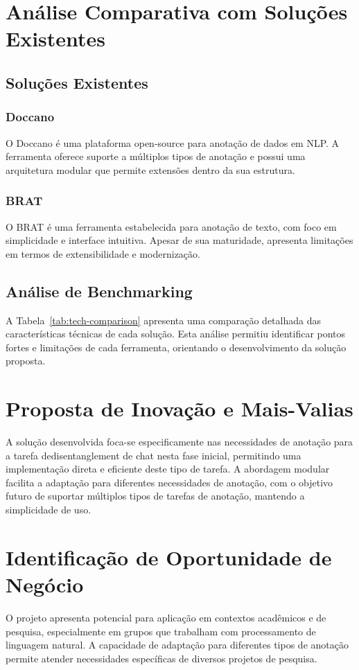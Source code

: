 \section{Análise Comparativa com Soluções Existentes}

\subsection{Soluções Existentes}

\subsubsection{Doccano}
O Doccano é uma plataforma open-source para anotação de dados em NLP. A ferramenta oferece suporte a múltiplos tipos de anotação e possui uma arquitetura modular que permite extensões dentro da sua estrutura.

\subsubsection{BRAT}
O BRAT é uma ferramenta estabelecida para anotação de texto, com foco em simplicidade e interface intuitiva. Apesar de sua maturidade, apresenta limitações em termos de extensibilidade e modernização.

\subsection{Análise de Benchmarking}

A Tabela~\ref{tab:tech-comparison} apresenta uma comparação detalhada das características técnicas de cada solução. Esta análise permitiu identificar pontos fortes e limitações de cada ferramenta, orientando o desenvolvimento da solução proposta.

\section{Proposta de Inovação e Mais-Valias}
A solução desenvolvida foca-se especificamente nas necessidades de anotação para a tarefa dedisentanglement de chat nesta fase inicial, permitindo uma implementação direta e eficiente deste tipo de tarefa. A abordagem modular facilita a adaptação para diferentes necessidades de anotação, com o objetivo futuro de suportar múltiplos tipos de tarefas de anotação, mantendo a simplicidade de uso.

\section{Identificação de Oportunidade de Negócio}
O projeto apresenta potencial para aplicação em contextos acadêmicos e de pesquisa, especialmente em grupos que trabalham com processamento de linguagem natural. A capacidade de adaptação para diferentes tipos de anotação permite atender necessidades específicas de diversos projetos de pesquisa.

